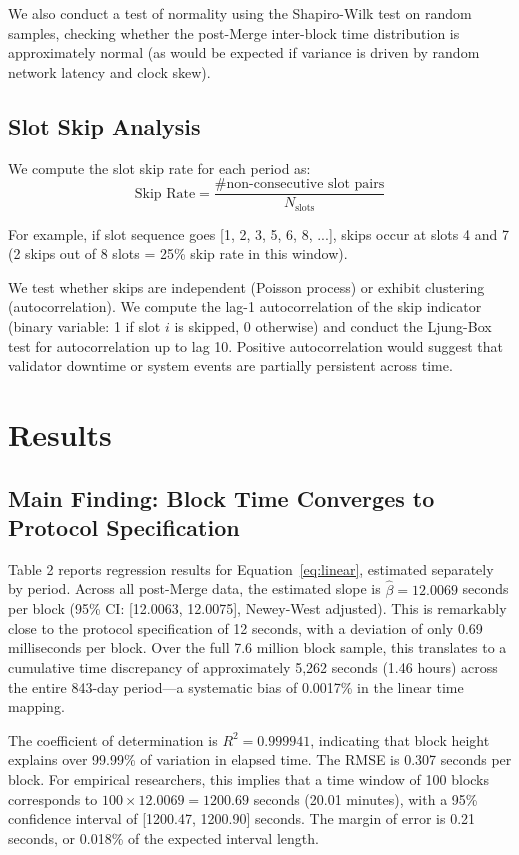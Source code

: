 \documentclass[12pt]{article}
\begin{document}
We also conduct a test of normality using the Shapiro-Wilk test on random samples, checking whether the post-Merge inter-block time distribution is approximately normal (as would be expected if variance is driven by random network latency and clock skew).

\subsection{Slot Skip Analysis}

We compute the slot skip rate for each period as:
\begin{equation}
\text{Skip Rate} = \frac{\# \text{non-consecutive slot pairs}}{N_{\text{slots}}}
\end{equation}

For example, if slot sequence goes [1, 2, 3, 5, 6, 8, ...], skips occur at slots 4 and 7 (2 skips out of 8 slots = 25\% skip rate in this window).

We test whether skips are independent (Poisson process) or exhibit clustering (autocorrelation). We compute the lag-1 autocorrelation of the skip indicator (binary variable: 1 if slot $i$ is skipped, 0 otherwise) and conduct the Ljung-Box test for autocorrelation up to lag 10. Positive autocorrelation would suggest that validator downtime or system events are partially persistent across time.

\section{Results}

\subsection{Main Finding: Block Time Converges to Protocol Specification}

Table 2 reports regression results for Equation~\eqref{eq:linear}, estimated separately by period. Across all post-Merge data, the estimated slope is $\hat{\beta} = 12.0069$ seconds per block (95\% CI: [12.0063, 12.0075], Newey-West adjusted). This is remarkably close to the protocol specification of 12 seconds, with a deviation of only 0.69 milliseconds per block. Over the full 7.6 million block sample, this translates to a cumulative time discrepancy of approximately 5,262 seconds (1.46 hours) across the entire 843-day period—a systematic bias of 0.0017\% in the linear time mapping.

The coefficient of determination is $R^2 = 0.999941$, indicating that block height explains over 99.99\% of variation in elapsed time. The RMSE is 0.307 seconds per block. For empirical researchers, this implies that a time window of 100 blocks corresponds to $100 \times 12.0069 = 1200.69$ seconds (20.01 minutes), with a 95\% confidence interval of [1200.47, 1200.90] seconds. The margin of error is 0.21 seconds, or 0.018\% of the expected interval length.
\end{document}

